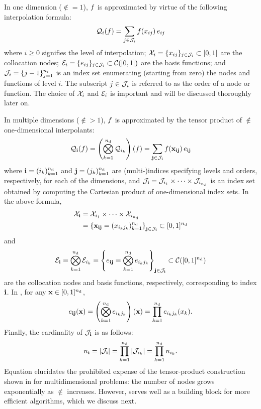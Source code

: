 In one dimension ($\nin = 1$), $f$ is approximated by virtue of the following
interpolation formula:
\begin{equation} \elab{tensor-1d}
  \tensor{i}(\f) = \sum_{j \in \oindex_i} \f(\x_{ij}) \, \e_{ij}
\end{equation}
where $i \geq 0$ signifies the level of interpolation; $\mathcal{X}_i = \{ x_{ij} \}_{j
\in \mathcal{J}_i} \subset [0, 1]$ are the collocation nodes; $\mathcal{E}_i = \{ e_{ij}
\}_{j \in \mathcal{J}_i} \subset \mathcal{C}([0, 1])$ are the basis functions; and
$\mathcal{J}_i = \{ j - 1 \}_{j = 1}^{n_i}$ is an index set enumerating (starting
from zero) the nodes and functions of level $i$. The subscript $j \in \mathcal{J}_i$
is referred to as the order of a node or function. The choice of $\mathcal{X}_i$ and
$\mathcal{E}_i$ is important and will be discussed thoroughly later on.

In multiple dimensions ($\nin > 1$), $f$ is approximated by the tensor product
of $\nin$ one-dimensional interpolants:
\begin{equation} \elab{tensor-nd}
  \tensor{\vi}(\f) = \left( \bigotimes_{k = 1}^\nin \tensor{i_k} \right)(\f) = \sum_{\vj \in \oindex_\vi} \f(\vx_{\vi\vj}) \, \e_{\vi\vj}
\end{equation}
where $\mathbf{i} = (i_k)_{k = 1}^{n_\text{d}}$ and $\mathbf{j} = (j_k)_{k = 1}^{n_\text{d}}$ are
(multi-)indices specifying levels and orders, respectively, for each of the
dimensions, and $\mathcal{J}_{\mathbf{i}} = \mathcal{J}_{i_1} \times \cdots \times
\mathcal{J}_{i_{n_\text{d}}}$ is an index set obtained by computing the Cartesian product of
one-dimensional index sets. In the above formula,
\begin{align}
  \X_\vi &= \X_{i_1} \times \cdots \times \X_{i_\nin} \elab{collocation-nodes} \\
         &= \left\{ \vx_{\vi\vj} = (\x_{i_k j_k})_{k = 1}^\nin \right\}_{\vj \in \oindex_\vi} \subset [0, 1]^\nin \nonumber
\end{align}
and
\begin{equation} \elab{basis-functions}
  \E_\vi = \bigotimes_{k = 1}^\nin \E_{i_k}
         = \left\{ \e_{\vi\vj} = \bigotimes_{k = 1}^\nin \e_{i_k j_k} \right\}_{\vj \in \oindex_\vi} \subset \continuous([0, 1]^\nin)
\end{equation}
are the collocation nodes and basis functions, respectively, corresponding to
index $\mathbf{i}$. In , for any $\mathbf{x} \in [0, 1]^{n_\text{d}}$,
\begin{equation} \elab{basis-function}
  \e_{\vi\vj}(\vx) = \left( \bigotimes_{k = 1}^\nin \e_{i_k j_k} \right)(\vx) = \prod_{k = 1}^\nin \e_{i_k j_k}(\x_k).
\end{equation}
Finally, the cardinality of $\mathcal{J}_{\mathbf{i}}$ is as follows:
\begin{equation} \elab{tensor-cardinality}
  \n_\vi = \card{\oindex_\vi} = \prod_{k = 1}^\nin \card{\oindex_{i_k}} = \prod_{k = 1}^\nin \n_{i_k}.
\end{equation}
Equation  elucidates the prohibited expense of the
tensor-product construction shown in  for multidimensional
problems: the number of nodes grows exponentially as $\nin$ increases. However,
 serves well as a building block for more efficient algorithms,
which we discuss next.
